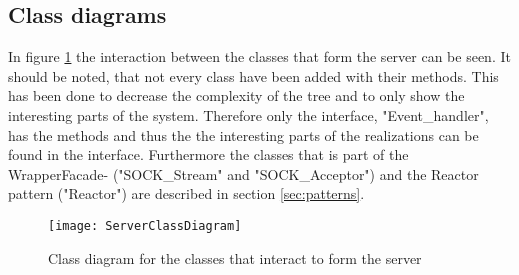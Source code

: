 \documentclass[Main]{subfiles}
\begin{document}
\subsection{Class diagrams}
In figure \ref{fig:wrapperfacadeuml} the interaction between the classes that form the server can be seen. It should be noted, that not every class have been added with their methods. 
This has been done to decrease the complexity of the tree and to only show the interesting parts of the system.
Therefore only the interface, "Event\_handler", has the methods and thus the the interesting parts of the realizations can be found in the interface.
Furthermore the classes that is part of the WrapperFacade- ("SOCK\_Stream" and "SOCK\_Acceptor") and the Reactor pattern ("Reactor") are described in section \ref{sec:patterns}.

\begin{figure}[hbtp]
\centering
\texttt{[image: ServerClassDiagram]}
\caption{Class diagram for the classes that interact to form the server}
\label{fig:wrapperfacadeuml}
\end{figure}
\end{document}
